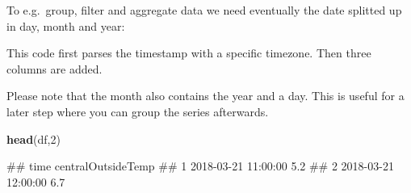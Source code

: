\documentclass[
  a4paperpaper,
]{book}
\newenvironment{Shaded}{\begin{snugshade}}{\end{snugshade}}
\newcommand{\DataTypeTok}[1]{\textcolor[rgb]{0.13,0.29,0.53}{#1}}
\newcommand{\DecValTok}[1]{\textcolor[rgb]{0.00,0.00,0.81}{#1}}
\newcommand{\KeywordTok}[1]{\textcolor[rgb]{0.13,0.29,0.53}{\textbf{#1}}}
\newcommand{\NormalTok}[1]{#1}
\newcommand{\OperatorTok}[1]{\textcolor[rgb]{0.81,0.36,0.00}{\textbf{#1}}}
\newcommand{\OtherTok}[1]{\textcolor[rgb]{0.56,0.35,0.01}{#1}}
\newcommand{\StringTok}[1]{\textcolor[rgb]{0.31,0.60,0.02}{#1}}
\let\oldShaded\Shaded
\let\endoldShaded\endShaded
\renewenvironment{Shaded}{\footnotesize\oldShaded}{\endoldShaded}
\let\oldverbatim\verbatim
\let\endoldverbatim\endverbatim
\renewenvironment{verbatim}{\footnotesize\oldverbatim}{\endoldverbatim}
\begin{document}
To e.g.~group, filter and aggregate data we need eventually the date splitted up in day, month and year:

\begin{Shaded}
\end{Shaded}

This code first parses the timestamp with a specific timezone. Then three columns are added.

Please note that the month also contains the year and a day. This is useful for a later step where you can group the series afterwards.

\begin{Shaded}
\begin{Highlighting}[]
\KeywordTok{head}\NormalTok{(df,}\DecValTok{2}\NormalTok{)}
\end{Highlighting}
\end{Shaded}

\begin{verbatim}
##                  time centralOutsideTemp
## 1 2018-03-21 11:00:00                5.2
## 2 2018-03-21 12:00:00                6.7
\end{verbatim}
\end{document}
